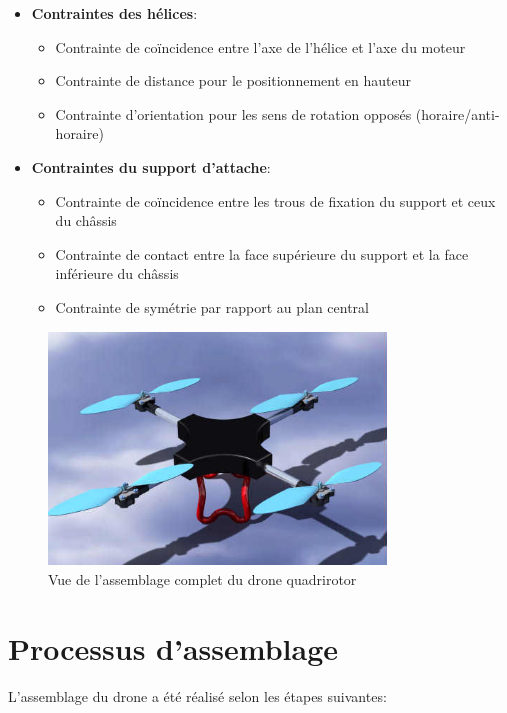 \documentclass[a4paper,12pt]{report}
\begin{document}
\begin{itemize}
    \item \textbf{Contraintes des hélices}:
    \begin{itemize}
        \item Contrainte de coïncidence entre l'axe de l'hélice et l'axe du moteur
        \item Contrainte de distance pour le positionnement en hauteur
        \item Contrainte d'orientation pour les sens de rotation opposés (horaire/anti-horaire)
    \end{itemize}
    
    \item \textbf{Contraintes du support d'attache}:
    \begin{itemize}
        \item Contrainte de coïncidence entre les trous de fixation du support et ceux du châssis
        \item Contrainte de contact entre la face supérieure du support et la face inférieure du châssis
        \item Contrainte de symétrie par rapport au plan central
    \end{itemize}
\end{itemize}

\begin{figure}[H]
    \centering
    \includegraphics[width=0.8\textwidth]{images/assemblage_drone.png}
    \caption{Vue de l'assemblage complet du drone quadrirotor}
    \label{fig:assemblage}
\end{figure}

\section{Processus d'assemblage}
L'assemblage du drone a été réalisé selon les étapes suivantes:
\end{document}
